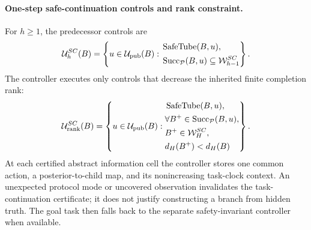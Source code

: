 \documentclass[letterpaper]{article} %
\begin{document}
\paragraph{One-step safe-continuation controls and rank constraint.}
For $h\geq 1$, the predecessor controls are
\begin{equation}
\mathcal U_h^{SC}(B)=
\left\{u\in\mathcal U_{\rm pub}(B):
\begin{aligned}
&\operatorname{SafeTube}(B,u),\\
&\operatorname{Succ}_{\mathcal P}(B,u)\subseteq
\mathcal W_{h-1}^{SC}
\end{aligned}\right\}.
\label{eq:sc-action-set}
\end{equation}
The controller executes only controls that decrease the inherited finite completion rank:
\begin{equation}
\mathcal U_{\rm rank}^{SC}(B)=
\left\{u\in\mathcal U_{\rm pub}(B):
\begin{aligned}
&\operatorname{SafeTube}(B,u),\\
&\forall B^+\in\operatorname{Succ}_{\mathcal P}(B,u),\\
&B^+\in\mathcal W_H^{SC},\\
&d_H(B^+)<d_H(B)
\end{aligned}\right\}.
\label{eq:rank-action}
\end{equation}
At each certified abstract information cell the controller stores one common action, a posterior-to-child map, and its nonincreasing task-clock context. An unexpected protocol mode or uncovered observation invalidates the task-continuation certificate; it does not justify constructing a branch from hidden truth. The goal task then falls back to the separate safety-invariant controller when available.
\end{document}

